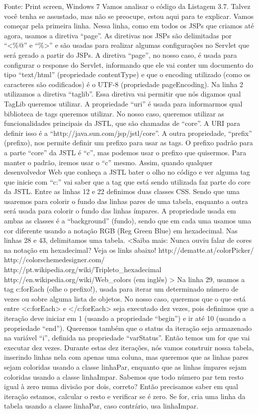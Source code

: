 Fonte: Print screen, Windows 7
Vamos analisar o código da Listagem 3.7. Talvez você tenha se assustado, mas não se preocupe, estou aqui para te explicar. Vamos começar pela primeira linha. Nessa linha, como em todos os JSPs que criamos até agora, usamos a diretiva “page”. As diretivas nos JSPs são delimitadas por “<\%@” e “\%>” e são usadas para realizar algumas configurações no Servlet que será gerado a partir do JSPs. A diretiva “page”, no nosso caso, é usada para configurar o response do Servlet, informando que ele vai conter um documento do tipo “text/html” (propriedade contentType) e que o encoding utilizado (como os caracteres são codificados) é o UTF-8 (propriedade pageEncoding). 
Na linha 2 utilizamos a diretiva “taglib”. Essa diretiva vai permitir que nós digamos qual TagLib queremos utilizar. A propriedade “uri” é usada para informarmos qual biblioteca de tags queremos utilizar. No nosso caso, queremos utilizar as funcionalidades principais da JSTL, que são chamadas de “core”. A URI para definir isso é a “http://java.sun.com/jsp/jstl/core”. A outra propriedade, “prefix” (prefixo), nos permite definir um prefixo para usar as tags. O prefixo padrão para a parte “core” da JSTL é “c”, mas podemos usar o prefixo que quisermos. Para manter o padrão, iremos usar o “c” mesmo. Assim, quando qualquer desenvolvedor Web que conheça a JSTL bater o olho no código e ver alguma tag que inicie com “c:” vai saber que a tag que está sendo utilizada faz parte do core da JSTL.
Entre as linhas 12 e 22 definimos duas classes CSS. Sendo que uma usaremos para colorir o fundo das linhas pares de uma tabela, enquanto a outra será usada para colorir o fundo das linhas ímpares. A propriedade usada em ambas as classes é a “background” (fundo), sendo que em cada uma usamos uma cor diferente usando a notação RGB (Reg Green Blue) em hexadecimal. Nas linhas 28 e 43, delimitamos uma tabela.
<Saiba mais:
Nunca ouviu falar de cores na notação em hexadecimal? Veja os links abaixo!
http://dematte.at/colorPicker/
http://colorschemedesigner.com/
http://pt.wikipedia.org/wiki/Tripleto\_hexadecimal
http://en.wikipedia.org/wiki/Web\_colors (em inglês)
>
Na linha 29, usamos a tag c:forEach (olhe o prefixo!), usada para iterar um determinado número de vezes ou sobre alguma lista de objetos. No nosso caso, queremos que o que está entre <c:forEach> e </c:forEach> seja executado dez vezes, pois definimos que a iteração deve iniciar em 1 (usando a propriedade “begin”) e ir até 10 (usando a propriedade “end”). Queremos também que o status da iteração seja armazenado na variável “i”, definida na propriedade “varStatus”. Então temos um for que vai executar dez vezes. Durante estas dez iterações, nós vamos construir nossa tabela, inserindo linhas nela com apenas uma coluna, mas queremos que as linhas pares sejam coloridas usando a classe linhaPar, enquanto que as linhas ímpares sejam coloridas usando a classe linhaImpar. Sabemos que todo número par tem resto igual à zero numa divisão por dois, correto? Então precisamos saber em qual iteração estamos, calcular o resto e verificar se é zero. Se for, cria uma linha da tabela usando a classe linhaPar, caso contrário, usa linhaImpar.
